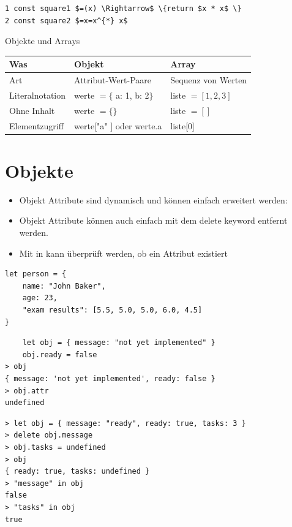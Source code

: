 \documentclass[10pt]{article}
\begin{document}
\begin{verbatim}
1 const square1 $=(x) \Rightarrow$ \{return $x * x$ \}
2 const square2 $=x=x^{*} x$
\end{verbatim}

Objekte und Arrays

\begin{center}
\begin{tabular}{|l|l|l|}
\hline
Was & Objekt & Array \\
\hline
Art & Attribut-Wert-Paare & Sequenz von Werten \\
\hline
Literalnotation & werte $=\{$ a: 1, b: 2$\}$ & liste $=[1,2,3]$ \\
\hline
Ohne Inhalt & werte $=\{ \}$ & liste $=[]$ \\
\hline
Elementzugriff & werte["a" $]$ oder werte.a & liste[0] \\
\hline
\end{tabular}
\end{center}

\section*{Objekte}
\begin{itemize}
  \item Objekt Attribute sind dynamisch und können einfach erweitert werden:
  \item Objekt Attribute können auch einfach mit dem delete keyword entfernt werden.
  \item Mit in kann überprüft werden, ob ein Attribut existiert
\end{itemize}

\begin{verbatim}
let person = {
    name: "John Baker",
    age: 23,
    "exam results": [5.5, 5.0, 5.0, 6.0, 4.5]
}
\end{verbatim}

\begin{verbatim}
    let obj = { message: "not yet implemented" }
    obj.ready = false
> obj
{ message: 'not yet implemented', ready: false }
> obj.attr
undefined
\end{verbatim}

\begin{verbatim}
> let obj = { message: "ready", ready: true, tasks: 3 }
> delete obj.message
> obj.tasks = undefined
> obj
{ ready: true, tasks: undefined }
> "message" in obj
false
> "tasks" in obj
true
\end{verbatim}
\end{document}

